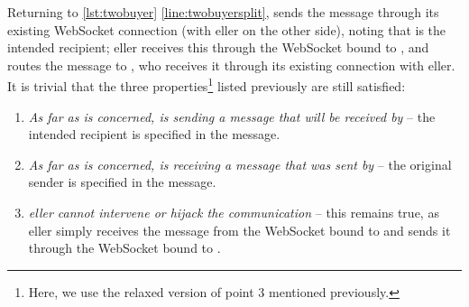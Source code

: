 Returning to \cref{lst:twobuyer} \cref{line:twobuyersplit},
 sends the  message through its existing
WebSocket connection (with eller on the other side),
noting that  is the intended recipient;
eller receives this through the WebSocket bound to
, and routes the message to , who receives it through
its existing connection with eller.
It is trivial that the three properties\footnote{Here, we use the relaxed
version of point 3 mentioned previously.} listed previously are still
satisfied: 

\begin{enumerate}
\item
\textit{As far as  is concerned,  is sending
a message that will be received by } -- 
the intended recipient is specified in the message.

\item
\textit{As far as  is concerned,  is receiving
a message that was sent by } --
the original sender is specified in the message.

\item
\textit{eller cannot intervene or hijack the communication} --
this remains true, as eller simply receives the message
from the WebSocket bound to  and sends it through the
WebSocket bound to .

\end{enumerate}